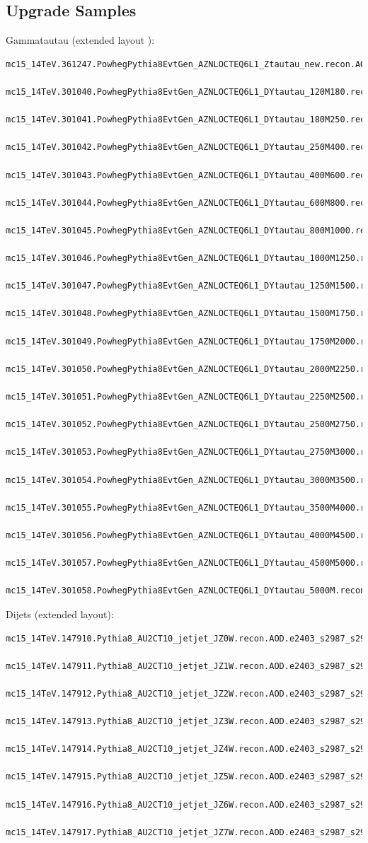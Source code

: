 \subsection{Upgrade Samples}
Gammatautau (extended layout \cite{itk_layout_slides}):
\begin{lstlisting}[basicstyle=\small\ttfamily, breaklines=true]
  mc15_14TeV.361247.PowhegPythia8EvtGen_AZNLOCTEQ6L1_Ztautau_new.recon.AOD.e4805_s2987_s2999_r8820
  mc15_14TeV.301040.PowhegPythia8EvtGen_AZNLOCTEQ6L1_DYtautau_120M180.recon.AOD.e5323_s2987_s2999_r8820
  mc15_14TeV.301041.PowhegPythia8EvtGen_AZNLOCTEQ6L1_DYtautau_180M250.recon.AOD.e5323_s2987_s2999_r8820
  mc15_14TeV.301042.PowhegPythia8EvtGen_AZNLOCTEQ6L1_DYtautau_250M400.recon.AOD.e5323_s2987_s2999_r8820
  mc15_14TeV.301043.PowhegPythia8EvtGen_AZNLOCTEQ6L1_DYtautau_400M600.recon.AOD.e5323_s2987_s2999_r8820
  mc15_14TeV.301044.PowhegPythia8EvtGen_AZNLOCTEQ6L1_DYtautau_600M800.recon.AOD.e5323_s2987_s2999_r8820
  mc15_14TeV.301045.PowhegPythia8EvtGen_AZNLOCTEQ6L1_DYtautau_800M1000.recon.AOD.e5323_s2987_s2999_r8820
  mc15_14TeV.301046.PowhegPythia8EvtGen_AZNLOCTEQ6L1_DYtautau_1000M1250.recon.AOD.e5323_s2987_s2999_r8820
  mc15_14TeV.301047.PowhegPythia8EvtGen_AZNLOCTEQ6L1_DYtautau_1250M1500.recon.AOD.e5323_s2987_s2999_r8820
  mc15_14TeV.301048.PowhegPythia8EvtGen_AZNLOCTEQ6L1_DYtautau_1500M1750.recon.AOD.e5323_s2987_s2999_r8820
  mc15_14TeV.301049.PowhegPythia8EvtGen_AZNLOCTEQ6L1_DYtautau_1750M2000.recon.AOD.e5323_s2987_s2999_r8820
  mc15_14TeV.301050.PowhegPythia8EvtGen_AZNLOCTEQ6L1_DYtautau_2000M2250.recon.AOD.e5323_s2987_s2999_r8820
  mc15_14TeV.301051.PowhegPythia8EvtGen_AZNLOCTEQ6L1_DYtautau_2250M2500.recon.AOD.e5323_s2987_s2999_r8820
  mc15_14TeV.301052.PowhegPythia8EvtGen_AZNLOCTEQ6L1_DYtautau_2500M2750.recon.AOD.e5323_s2987_s2999_r8820
  mc15_14TeV.301053.PowhegPythia8EvtGen_AZNLOCTEQ6L1_DYtautau_2750M3000.recon.AOD.e5323_s2987_s2999_r8820
  mc15_14TeV.301054.PowhegPythia8EvtGen_AZNLOCTEQ6L1_DYtautau_3000M3500.recon.AOD.e5323_s2987_s2999_r8820
  mc15_14TeV.301055.PowhegPythia8EvtGen_AZNLOCTEQ6L1_DYtautau_3500M4000.recon.AOD.e5323_s2987_s2999_r8820
  mc15_14TeV.301056.PowhegPythia8EvtGen_AZNLOCTEQ6L1_DYtautau_4000M4500.recon.AOD.e5323_s2987_s2999_r8820
  mc15_14TeV.301057.PowhegPythia8EvtGen_AZNLOCTEQ6L1_DYtautau_4500M5000.recon.AOD.e5323_s2987_s2999_r8820
  mc15_14TeV.301058.PowhegPythia8EvtGen_AZNLOCTEQ6L1_DYtautau_5000M.recon.AOD.e5323_s2987_s2999_r8820
\end{lstlisting}
Dijets (extended layout):
\begin{lstlisting}[basicstyle=\small\ttfamily, breaklines=true]
  mc15_14TeV.147910.Pythia8_AU2CT10_jetjet_JZ0W.recon.AOD.e2403_s2987_s2999_r8820
  mc15_14TeV.147911.Pythia8_AU2CT10_jetjet_JZ1W.recon.AOD.e2403_s2987_s2999_r8820
  mc15_14TeV.147912.Pythia8_AU2CT10_jetjet_JZ2W.recon.AOD.e2403_s2987_s2999_r8820
  mc15_14TeV.147913.Pythia8_AU2CT10_jetjet_JZ3W.recon.AOD.e2403_s2987_s2999_r8820
  mc15_14TeV.147914.Pythia8_AU2CT10_jetjet_JZ4W.recon.AOD.e2403_s2987_s2999_r8820
  mc15_14TeV.147915.Pythia8_AU2CT10_jetjet_JZ5W.recon.AOD.e2403_s2987_s2999_r8820
  mc15_14TeV.147916.Pythia8_AU2CT10_jetjet_JZ6W.recon.AOD.e2403_s2987_s2999_r8820
  mc15_14TeV.147917.Pythia8_AU2CT10_jetjet_JZ7W.recon.AOD.e2403_s2987_s2999_r8820
\end{lstlisting}


